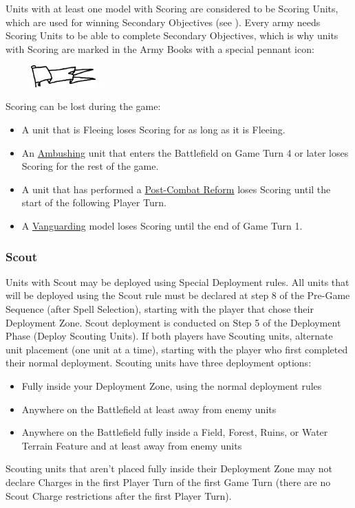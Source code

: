 Units with at least one model with Scoring are considered to be Scoring Units, which are used for winning Secondary Objectives (see ). Every army needs Scoring Units to be able to complete Secondary Objectives, which is why units with Scoring are marked in the Army Books with a special pennant icon:

\begin{center}
\textcolor{white}{debug}\includegraphics[width=2.5cm]{../Layout/pics/logo_scoring.png}\textcolor{white}{debug}
\end{center}


Scoring can be lost during the game:
\begin{itemize}
\item A unit that is Fleeing loses Scoring for as long as it is Fleeing.
\item An \hyperref[ambush]{Ambushing} unit that enters the Battlefield on Game Turn 4 or later loses Scoring for the rest of the game.
\item A unit that has performed a \hyperref[post_combat_reform]{Post-Combat Reform} loses Scoring until the start of the following Player Turn.
\item A \hyperref[vanguard]{Vanguarding} model loses Scoring until the end of Game Turn 1.
\end{itemize}

\subsubsection{Scout}
\idx[main=y]{\scout}\label{scout}

Units with Scout may be deployed using Special Deployment rules. All units that will be deployed using the Scout rule must be declared at step 8 of the Pre-Game Sequence (after Spell Selection), starting with the player that chose their Deployment Zone. Scout deployment is conducted on Step 5 of the Deployment Phase (Deploy Scouting Units). If both players have Scouting units, alternate unit placement (one unit at a time), starting with the player who first completed their normal deployment. Scouting units have three deployment options:
\begin{itemize}
\item Fully inside your Deployment Zone, using the normal deployment rules
\item Anywhere on the Battlefield at least  away from enemy units
\item Anywhere on the Battlefield fully inside a Field, Forest, Ruins, or Water Terrain Feature and at least  away from enemy units
\end{itemize}
Scouting units that aren't placed fully inside their Deployment Zone may not declare Charges in the first Player Turn of the first Game Turn (there are no Scout Charge restrictions after the first Player Turn).

